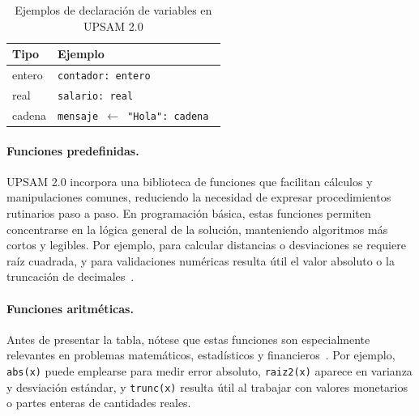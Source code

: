 \documentclass[12pt,twoside]{book}
\begin{document}
							\begin{table}[h]
								\centering
								\caption{Ejemplos de declaración de variables en UPSAM 2.0}
								\label{tab:upsam_decl_vars}
								\begin{tabular}{ll}
									\hline
									\textbf{Tipo} & \textbf{Ejemplo} \\
									\hline
									entero & \texttt{contador: entero} \\
									real & \texttt{salario: real} \\
									cadena & \texttt{mensaje $\leftarrow$ "Hola": cadena } \\
									\hline
								\end{tabular}
							\end{table}
							
						\paragraph{Funciones predefinidas.}
							UPSAM 2.0 incorpora una biblioteca de funciones que facilitan cálculos y manipulaciones comunes, reduciendo la necesidad de expresar procedimientos rutinarios paso a paso. En programación básica, estas funciones permiten concentrarse en la lógica general de la solución, manteniendo algoritmos más cortos y legibles. Por ejemplo, para calcular distancias o desviaciones se requiere raíz cuadrada, y para validaciones numéricas resulta útil el valor absoluto o la truncación de decimales~\cite{Cormen2022Introduction}.
							
						\paragraph{Funciones aritméticas.}
							Antes de presentar la tabla, nótese que estas funciones son especialmente relevantes en problemas matemáticos, estadísticos y financieros~\cite{Joyanes2007Fundamentos,Chapra2014Numerical}. Por ejemplo, \texttt{abs(x)} puede emplearse para medir error absoluto, \texttt{raiz2(x)} aparece en varianza y desviación estándar, y \texttt{trunc(x)} resulta útil al trabajar con valores monetarios o partes enteras de cantidades reales.
							
\end{document}

